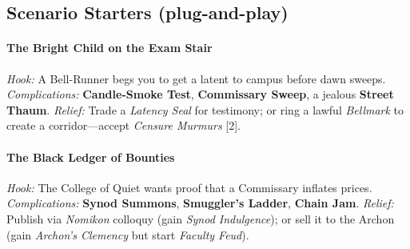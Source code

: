 \subsection*{Scenario Starters (plug-and-play)}
\paragraph{The Bright Child on the Exam Stair}
\emph{Hook:} A Bell-Runner begs you to get a latent to campus before dawn sweeps.  
\emph{Complications:} \textbf{Candle-Smoke Test}, \textbf{Commissary Sweep}, a jealous \textbf{Street Thaum}.  
\emph{Relief:} Trade a \emph{Latency Seal} for testimony; or ring a lawful \emph{Bellmark} to create a corridor—accept \emph{Censure Murmurs} [2].

\paragraph{The Black Ledger of Bounties}
\emph{Hook:} The College of Quiet wants proof that a Commissary inflates prices.  
\emph{Complications:} \textbf{Synod Summons}, \textbf{Smuggler’s Ladder}, \textbf{Chain Jam}.  
\emph{Relief:} Publish via \emph{Nomikon} colloquy (gain \emph{Synod Indulgence}); or sell it to the Archon (gain \emph{Archon’s Clemency} but start \emph{Faculty Feud}).